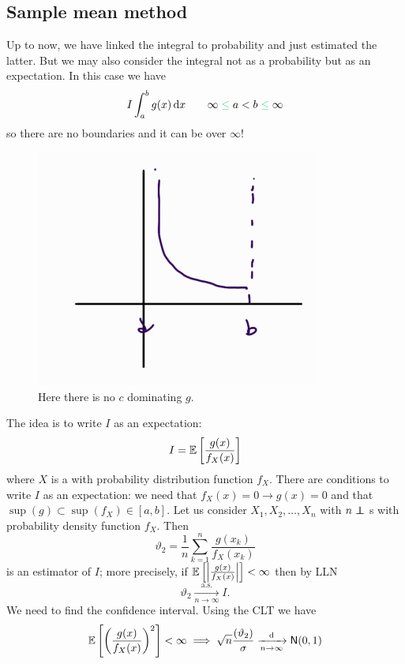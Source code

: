 \documentclass[12pt]{report}
\begin{document}
\subsection{Sample mean method}
Up to now, we have linked the integral to probability and just estimated the latter. But we may also consider the integral not as a probability but as an expectation. In this case we have
\begin{equation*}
	I\int_{a}^{b}g(x)\dx\qquad\infty\mathcolor{SeaGreen3}{\leq}a<b\mathcolor{SeaGreen3}{\leq}\infty
\end{equation*}
so there are no boundaries and it can be over $\infty$!
\begin{figure}[h]
	\centering
	\includegraphics[width=0.5\linewidth]{img/screenshot070}
	\caption{Here there is no $c$ dominating $g$.}
	\label{fig:screenshot070}
\end{figure}
The idea is to write $I$ as an expectation:
\begin{equation*}
	I=\mathbb{E}\left[\frac{g(x)}{f_{X}(x)}\right]
\end{equation*}
where $X$ is a \rv{} with probability distribution function $f_{X}$. There are conditions to write $I$ as an expectation: we need that $f_{X}(x)=0\to g(x)=0$ and that $\sup(g)\subset\sup(f_{X})\in[a,b]$.
Let us consider $X_1,X_2,\ldots,X_n$ with $n\independent$ \rv s with probability density function $f_{X}$. Then
\begin{equation*}
	\vartheta_2=\frac{1}{n}\sum_{k=1}^{n}\frac{g(x_k)}{f_X(x_k)}
\end{equation*}
is an estimator of $I$; more precisely, if $\mathbb{E}\left[\left|\frac{g(x)}{f_X(x)}\right|\right]<\infty$ then by LLN
\begin{equation*}
	\vartheta_2\xrightarrow[n\to\infty]{\mathrm{a.s.}}I.
\end{equation*}
We need to find the confidence interval. Using the CLT we have
\begin{equation*}
	\mathbb{E}\left[\left(\frac{g(x)}{f_X(x)}\right)^{2}\right]<\infty\implies\sqrt{n}\frac{(\vartheta_2)}{\sigma}\xrightarrow[n\to\infty]{\mathrm{d}}\mathsf{N}(0,1)
\end{equation*}
\end{document}
